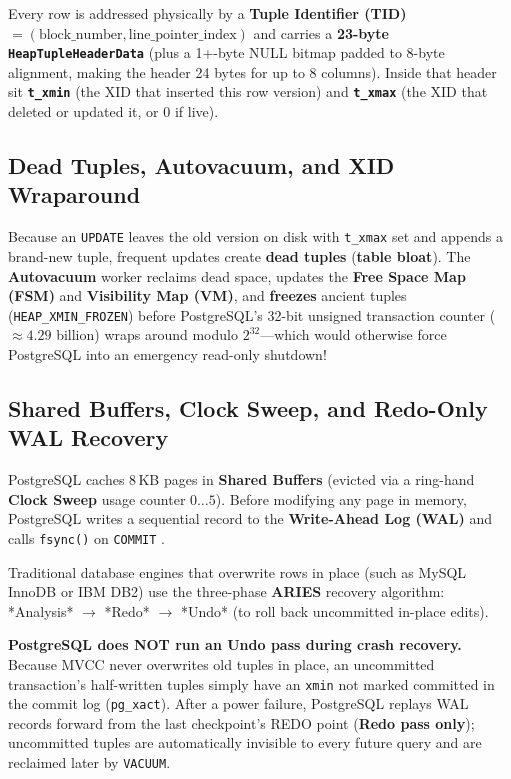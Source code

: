 Every row is addressed physically by a \textbf{Tuple Identifier (TID)} $= (\text{block\_number}, \text{line\_pointer\_index})$ and carries a \textbf{23-byte \texttt{HeapTupleHeaderData}} (plus a 1+-byte NULL bitmap padded to 8-byte alignment, making the header 24 bytes for up to 8 columns). Inside that header sit \textbf{\texttt{t\_xmin}} (the XID that inserted this row version) and \textbf{\texttt{t\_xmax}} (the XID that deleted or updated it, or $0$ if live).

\subsection{Dead Tuples, Autovacuum, and XID Wraparound}

Because an \texttt{UPDATE} leaves the old version on disk with \texttt{t\_xmax} set and appends a brand-new tuple, frequent updates create \textbf{dead tuples} (\textbf{table bloat}). The \textbf{Autovacuum} worker reclaims dead space, updates the \textbf{Free Space Map (FSM)} and \textbf{Visibility Map (VM)}, and \textbf{freezes} ancient tuples (\texttt{HEAP\_XMIN\_FROZEN}) before PostgreSQL's 32-bit unsigned transaction counter ($\approx 4.29$ billion) wraps around modulo $2^{32}$---which would otherwise force PostgreSQL into an emergency read-only shutdown!

\subsection{Shared Buffers, Clock Sweep, and Redo-Only WAL Recovery}

PostgreSQL caches 8\,KB pages in \textbf{Shared Buffers} (evicted via a ring-hand \textbf{Clock Sweep} usage counter $0\dots 5$). Before modifying any page in memory, PostgreSQL writes a sequential record to the \textbf{Write-Ahead Log (WAL)} and calls \texttt{fsync()} on \texttt{COMMIT} \cite{petrov2019database}.

\begin{productionwarningbox}
Traditional database engines that overwrite rows in place (such as MySQL InnoDB or IBM DB2) use the three-phase \textbf{ARIES} recovery algorithm: *Analysis* $\to$ *Redo* $\to$ *Undo* (to roll back uncommitted in-place edits).

\textbf{PostgreSQL does NOT run an Undo pass during crash recovery.} Because MVCC never overwrites old tuples in place, an uncommitted transaction's half-written tuples simply have an \texttt{xmin} not marked committed in the commit log (\texttt{pg\_xact}). After a power failure, PostgreSQL replays WAL records forward from the last checkpoint's REDO point (\textbf{Redo pass only}); uncommitted tuples are automatically invisible to every future query and are reclaimed later by \texttt{VACUUM}.
\end{productionwarningbox}

